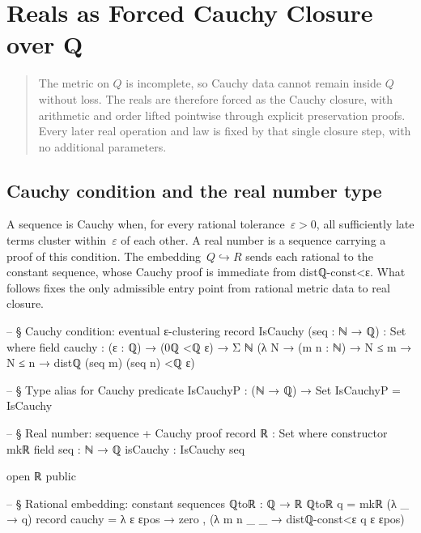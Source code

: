 \documentclass[11pt,a4paper]{book}
\def\mathbb#1{#1}%
\def\texttt#1{#1}%
\def\texorpdfstring#1#2{#2}%
\begin{document}
\chapter{Reals as Forced Cauchy Closure over \texorpdfstring{$\mathbb{Q}$}{Q}}
\label{ch:reals-cauchy}

\begin{quote}
The metric on $\mathbb{Q}$ is incomplete, so Cauchy data cannot remain inside
$\mathbb{Q}$ without loss.  The reals are therefore forced as the Cauchy
closure, with arithmetic and order lifted pointwise through explicit
preservation proofs.  Every later real operation and law is fixed by that
single closure step, with no additional parameters.
\end{quote}


\section{Cauchy condition and the real number type}

A sequence is Cauchy when, for every rational tolerance~$\varepsilon > 0$,
all sufficiently late terms cluster within~$\varepsilon$ of each other.
A real number is a sequence carrying a proof of this condition.
The embedding~$\mathbb{Q} \hookrightarrow \mathbb{R}$ sends each rational
to the constant sequence, whose Cauchy proof is immediate from
\texttt{distℚ-const<ε}.  What follows fixes the only admissible entry point
from rational metric data to real closure.

\begin{code}
-- § Cauchy condition: eventual ε-clustering
record IsCauchy (seq : ℕ → ℚ) : Set where
  field
    cauchy : (ε : ℚ) → (0ℚ <ℚ ε) → Σ ℕ (λ N → (m n : ℕ) → N ≤ m → N ≤ n → distℚ (seq m) (seq n) <ℚ ε)

-- § Type alias for Cauchy predicate
IsCauchyP : (ℕ → ℚ) → Set
IsCauchyP = IsCauchy

-- § Real number: sequence + Cauchy proof
record ℝ : Set where
  constructor mkℝ
  field
    seq : ℕ → ℚ
    isCauchy : IsCauchy seq

open ℝ public

-- § Rational embedding: constant sequences
ℚtoℝ : ℚ → ℝ
ℚtoℝ q = mkℝ (λ _ → q) record
  { cauchy = λ ε εpos →
      zero , (λ m n _ _ → distℚ-const<ε q ε εpos)
  }
\end{code}
\end{document}
